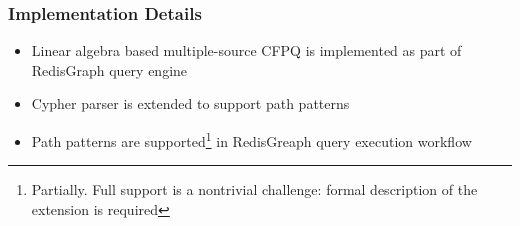 \documentclass[xcolor=table,aspectratio=169]{beamer}
\begin{document}
\begin{frame}[fragile]
\begin{minipage}[m]{0.55\linewidth}
    {
    }


  \end{minipage}


\end{frame}


\begin{frame}[fragile] \frametitle{Implementation Details}
  \begin{itemize}
  \item Linear algebra based multiple-source CFPQ is implemented as part of RedisGraph query engine
  \item Cypher parser is extended to support path patterns
  \item Path patterns are supported\footnote{Partially. Full support is a nontrivial challenge: formal description of the extension is required} in RedisGreaph query execution workflow
  \end{itemize}
  
\end{frame}
\end{document}
